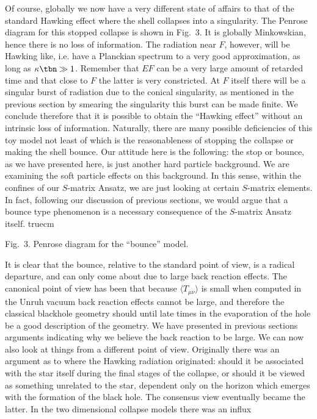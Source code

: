 Of course, globally we now have a very different state of affairs to
that of the standard Hawking effect where the shell collapses into a
singularity. The Penrose diagram for this stopped collapse is shown in
Fig.~3.  It is globally Minkowskian, hence there is no loss of
information. The radiation near $F$, however, will be Hawking like,
i.e.  have a Planckian spectrum to a very good approximation, as long
as $\kappa\tbn\gg1$.  Remember that $EF$ can be a very large amount of
retarded time and that close to $F$ the latter is very constricted.  At
$F$ itself there will be a singular burst of radiation due to the
conical singularity, as mentioned in the previous section by smearing
the singularity this burst can be made finite. We conclude therefore
that it is possible to obtain the ``Hawking effect'' without an
intrinsic loss of information.  Naturally, there are many possible
deficiencies of this toy model not least of which is the reasonableness
of stopping the collapse or making the shell bounce. Our attitude here
is the following: the stop or bounce, as we have presented here, is
just another hard particle background. We are examining the soft
particle effects on this background.  In this sense, within the
confines of our $S$-matrix Ansatz, we are just looking at certain
$S$-matrix elements.  In fact, following our discussion of previous
sections, we would argue that a bounce type phenomenon is a necessary
consequence of the $S$-matrix Ansatz itself.
\midinsert
{} truecm
\centerline {Fig.~3. Penrose diagram for the  ``bounce'' model.}
\endinsert
It is clear that the bounce, relative to the standard point of view, is
a radical departure, and can only come about due to large back reaction
effects. The canonical point of view has been that because $\langle
T_{\mu\nu}\rangle$ is small when computed in the Unruh vacuum back
reaction effects cannot be large, and therefore the classical blackhole
geometry should until late times in the evaporation of the hole be a
good description of the geometry. We have presented in previous
sections arguments indicating why we believe the back reaction to be
large. We can now also look at things from a different point of view.
Originally there was an argument as to where the Hawking radiation
originated: should it be associated with the star itself during the
final stages of the collapse, or should it be viewed as something
unrelated to the star, dependent only on the horizon which emerges with
the formation of the black hole. The consensus view eventually became
the latter. In the two dimensional collapse models there was an influx
